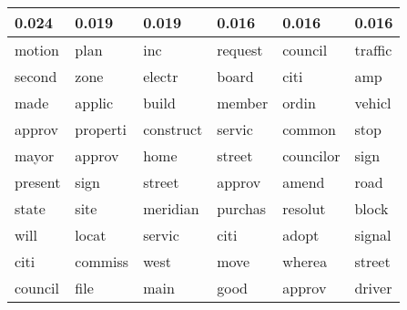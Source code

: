 \begin{table}[ht]
\centering
\begin{tabular}{llllll}
  \hline
0.024 & 0.019 & 0.019 & 0.016 & 0.016 & 0.016 \\ 
  \hline
motion & plan & inc & request & council & traffic \\ 
  second & zone & electr & board & citi & amp \\ 
  made & applic & build & member & ordin & vehicl \\ 
  approv & properti & construct & servic & common & stop \\ 
  mayor & approv & home & street & councilor & sign \\ 
  present & sign & street & approv & amend & road \\ 
  state & site & meridian & purchas & resolut & block \\ 
  will & locat & servic & citi & adopt & signal \\ 
  citi & commiss & west & move & wherea & street \\ 
  council & file & main & good & approv & driver \\ 
   \hline
\end{tabular}
\label{tabSTMINRep}
\end{table}

